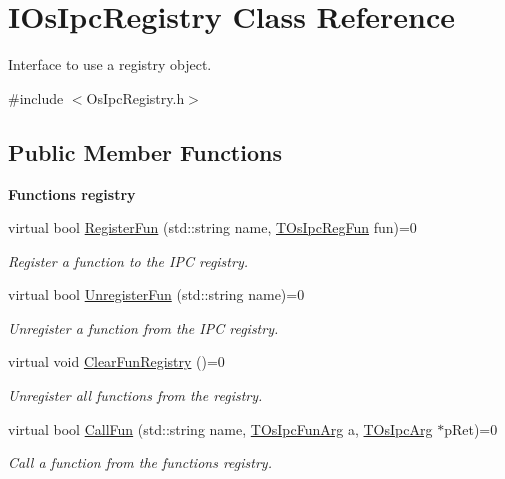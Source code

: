 \hypertarget{classIOsIpcRegistry}{}\section{I\+Os\+Ipc\+Registry Class Reference}
\label{classIOsIpcRegistry}


Interface to use a registry object.  




{\ttfamily \#include $<$Os\+Ipc\+Registry.\+h$>$}

\subsection*{Public Member Functions}
\begin{Indent}\textbf{ Functions registry}\par
\begin{DoxyCompactItemize}
\item 
virtual bool \hyperlink{classIOsIpcRegistry_aa0a7789bc4b73ba3fd9ffc95c36b211d}{Register\+Fun} (std\+::string name, \hyperlink{structTOsIpcRegFun}{T\+Os\+Ipc\+Reg\+Fun} fun)=0
\begin{DoxyCompactList}\small\item\em Register a function to the I\+PC registry. \end{DoxyCompactList}\item 
virtual bool \hyperlink{classIOsIpcRegistry_a8edb89cab48ee05564504402c9e18481}{Unregister\+Fun} (std\+::string name)=0
\begin{DoxyCompactList}\small\item\em Unregister a function from the I\+PC registry. \end{DoxyCompactList}\item 
virtual void \hyperlink{classIOsIpcRegistry_a6b4ffa30ef275d63227dbd5c5d586802}{Clear\+Fun\+Registry} ()=0
\begin{DoxyCompactList}\small\item\em Unregister all functions from the registry. \end{DoxyCompactList}\item 
virtual bool \hyperlink{classIOsIpcRegistry_af123e37a919ea2d2026976857bdb3199}{Call\+Fun} (std\+::string name, \hyperlink{structTOsIpcFunArg}{T\+Os\+Ipc\+Fun\+Arg} a, \hyperlink{unionTOsIpcArg}{T\+Os\+Ipc\+Arg} $\ast$p\+Ret)=0
\begin{DoxyCompactList}\small\item\em Call a function from the functions registry. \end{DoxyCompactList}\end{DoxyCompactItemize}
\end{Indent}
